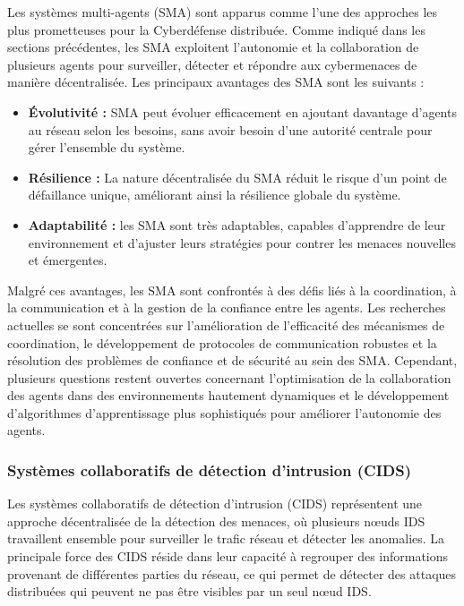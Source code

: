 Les systèmes multi-agents (SMA) sont apparus comme l'une des approches les plus prometteuses pour la Cyberdéfense distribuée. Comme indiqué dans les sections précédentes, les SMA exploitent l'autonomie et la collaboration de plusieurs agents pour surveiller, détecter et répondre aux cybermenaces de manière décentralisée. Les principaux avantages des SMA sont les suivants :

\begin{itemize}
    \item \textbf{Évolutivité :} SMA peut évoluer efficacement en ajoutant davantage d'agents au réseau selon les besoins, sans avoir besoin d'une autorité centrale pour gérer l'ensemble du système.
    \item \textbf{Résilience :} La nature décentralisée du SMA réduit le risque d'un point de défaillance unique, améliorant ainsi la résilience globale du système.
    \item \textbf{Adaptabilité :} les SMA sont très adaptables, capables d'apprendre de leur environnement et d'ajuster leurs stratégies pour contrer les menaces nouvelles et émergentes.
\end{itemize}

Malgré ces avantages, les SMA sont confrontés à des défis liés à la coordination, à la communication et à la gestion de la confiance entre les agents. Les recherches actuelles se sont concentrées sur l'amélioration de l'efficacité des mécanismes de coordination, le développement de protocoles de communication robustes et la résolution des problèmes de confiance et de sécurité au sein des SMA. Cependant, plusieurs questions restent ouvertes concernant l'optimisation de la collaboration des agents dans des environnements hautement dynamiques et le développement d'algorithmes d'apprentissage plus sophistiqués pour améliorer l'autonomie des agents.

\subsubsection{Systèmes collaboratifs de détection d'intrusion (CIDS)}

Les systèmes collaboratifs de détection d'intrusion (CIDS) représentent une approche décentralisée de la détection des menaces, où plusieurs nœuds IDS travaillent ensemble pour surveiller le trafic réseau et détecter les anomalies. La principale force des CIDS réside dans leur capacité à regrouper des informations provenant de différentes parties du réseau, ce qui permet de détecter des attaques distribuées qui peuvent ne pas être visibles par un seul nœud IDS.


